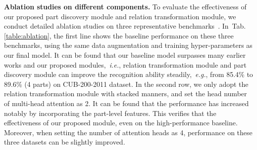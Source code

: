 \documentclass[journal]{IEEEtran}
\def\ie{{\em i.e.}}
\def\eg{{\em e.g.}}
\newcommand{\tabref}[1]{Tab. \ref{#1}}
\begin{document}
\textbf{Ablation studies on different components.} To evaluate the effectiveness of our proposed part discovery module and relation transformation module, we conduct detailed ablation studies on three representative benchmarks~\cite{wah2011caltech,krause20133d,maji2013fine}. In~\tabref{table:ablation}, the first line shows the baseline performance on these three benchmarks, using the same data augmentation and training hyper-parameters as our final model. It can be found that our baseline model surpasses many earlier works and our proposed modules,~\ie, relation transformation module  and part discovery module  can improve the recognition ability steadily,~\eg, from 85.4\% to 89.6\% (4 parts) on CUB-200-2011 dataset.
In the second row, we only adopt the relation transformation module with stacked manners, and set the head number of multi-head attention as 2. It can be found that the performance has increased notably by incorporating the part-level features. This verifies that the effectiveness of our proposed module, even on the high-performance baseline. Moreover, when setting the number of attention heads as 4, performance on these three datasets can be slightly improved.

\begin{table}[t]
\end{table}
\end{document}
